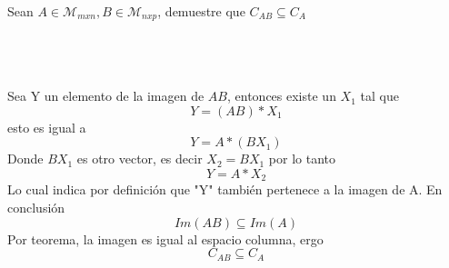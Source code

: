 \begin{ejercicio}
Sean $A\in \mathcal{M}_{mxn}, B \in \mathcal{M}_{nxp}$, demuestre que $C_{AB}\subseteq C_A$


~\\

\sol
~\\
~\\
Sea Y un elemento de la imagen de $AB$, entonces existe un $X_1$ tal que 
$$Y=(AB)*X_1$$
esto es igual a 
$$Y=A*(BX_1)$$
Donde $BX_1$ es otro vector, es decir $X_2=BX_1$
por lo tanto
$$Y=A*X_2$$
Lo cual indica por definición que "Y" también pertenece a la imagen de A.
En conclusión $$Im(AB) \subseteq Im(A)$$
Por teorema, la imagen es igual al espacio columna, ergo
$$C_{AB} \subseteq C_A$$

\end{ejercicio}

\newpage
